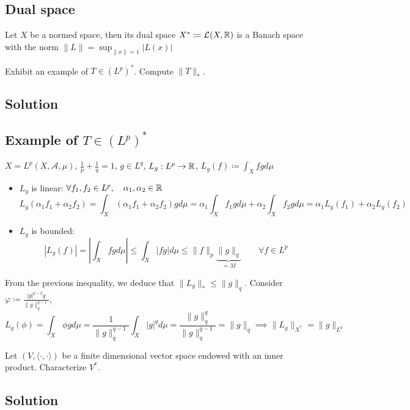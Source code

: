 \subsection{Dual space}
Let $X$ be a normed space, then its dual space $X^*\coloneqq \mathcal{L}(X,\mathbb{R})$ is a Banach space with the norm $\|L\|=\displaystyle\sup_{\|x\|=1}|L(x)|$


\question
Exhibit an example of $T \in (L^p)^{*}$. Compute $\|T\|_{*}$.

\subsection*{Solution}

\subsection{Example of \texorpdfstring{$T\in (L^p)^{*}$}{a linear operator in the dual space of Lp}} 
$X=L^p(X,\mathscr{A},\mu)$, $\frac{1}{p}+\frac{1}{q}=1$, $g\in L^q$, $L_g:L^p\rightarrow \mathbb{R}$, $L_g(f)\coloneqq\int_Xfgd\mu$

\begin{itemize}
    \item $L_g$ is linear: $\forall f_1,f_2\in L^p, \quad\alpha_1,\alpha_2\in\mathbb{R}$
    \[L_g(\alpha_1f_1+\alpha_2f_2)=\int_X(\alpha_1f_1+\alpha_2f_2)gd\mu=\alpha_1\int_Xf_1gd\mu+\alpha_2\int_Xf_2gd\mu=\alpha_1L_g(f_1)+\alpha_2L_g(f_2)\]
    \item $L_g$ is bounded:
    \[|L_g(f)|=|\int_Xfgd\mu|\leq\int_X|fg|d\mu\leq \|f\|_p\underbrace{\|g\|_q}_{=M}\qquad\forall f\in L^p\]
\end{itemize}

From the previous inequality, we deduce that $\|L_g\|_*\leq\|g\|_q$. Consider $\displaystyle \varphi\coloneqq\frac{|g|^{q-2}g}{\|g\|_q^{q-1}}$,
\[L_g(\phi)=\int_X\phi gd\mu =\frac{1}{\|g\|_{q}^{q-1}}\int_X|g|^qd\mu=\frac{\|g\|_q^q}{\|g\|_q^{q-1}}=\|g\|_q\implies\|L_g\|_{X^*}=\|g\|_{L^q}\]


\question
Let $(V, \langle \cdot, \cdot \rangle)$ be a finite dimensional vector space endowed with an inner product. Characterize $V^{*}$.

\subsection*{Solution}

